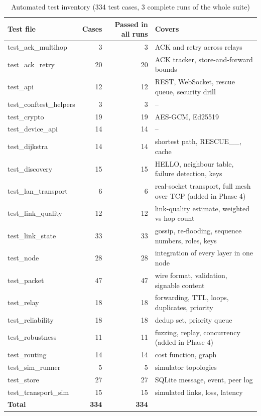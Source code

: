 \begin{table}[htbp]
\caption[Automated test inventory]{Automated test inventory (334 test cases, 3 complete runs of the whole suite)}
\label{tab:testinv}
\small
\begin{tabularx}{\textwidth}{@{}>{\raggedright\arraybackslash}p{3.4cm}rr>{\raggedright\arraybackslash}X@{}}
\toprule
\textbf{Test file} & \textbf{Cases} & \textbf{Passed in all runs} & \textbf{Covers} \\ \midrule
test\_\allowbreak{}ack\_\allowbreak{}multihop & 3 & 3 & ACK and retry across relays \\
test\_\allowbreak{}ack\_\allowbreak{}retry & 20 & 20 & ACK tracker, store-and-forward bounds \\
test\_\allowbreak{}api & 12 & 12 & REST, WebSocket, rescue queue, security drill \\
test\_\allowbreak{}conftest\_\allowbreak{}helpers & 3 & 3 & -- \\
test\_\allowbreak{}crypto & 19 & 19 & AES-GCM, Ed25519 \\
test\_\allowbreak{}device\_\allowbreak{}api & 14 & 14 & -- \\
test\_\allowbreak{}dijkstra & 14 & 14 & shortest path, RESCUE\_\_, cache \\
test\_\allowbreak{}discovery & 15 & 15 & HELLO, neighbour table, failure detection, keys \\
test\_\allowbreak{}lan\_\allowbreak{}transport & 6 & 6 & real-socket transport, full mesh over TCP (added in Phase 4) \\
test\_\allowbreak{}link\_\allowbreak{}quality & 12 & 12 & link-quality estimate, weighted vs hop count \\
test\_\allowbreak{}link\_\allowbreak{}state & 33 & 33 & gossip, re-flooding, sequence numbers, roles, keys \\
test\_\allowbreak{}node & 28 & 28 & integration of every layer in one node \\
test\_\allowbreak{}packet & 47 & 47 & wire format, validation, signable content \\
test\_\allowbreak{}relay & 18 & 18 & forwarding, TTL, loops, duplicates, priority \\
test\_\allowbreak{}reliability & 18 & 18 & dedup set, priority queue \\
test\_\allowbreak{}robustness & 11 & 11 & fuzzing, replay, concurrency (added in Phase 4) \\
test\_\allowbreak{}routing & 14 & 14 & cost function, graph \\
test\_\allowbreak{}sim\_\allowbreak{}runner & 5 & 5 & simulator topologies \\
test\_\allowbreak{}store & 27 & 27 & SQLite message, event, peer log \\
test\_\allowbreak{}transport\_\allowbreak{}sim & 15 & 15 & simulated links, loss, latency \\
\textbf{Total} & \textbf{334} & \textbf{334} &  \\
\bottomrule
\end{tabularx}
\end{table}
